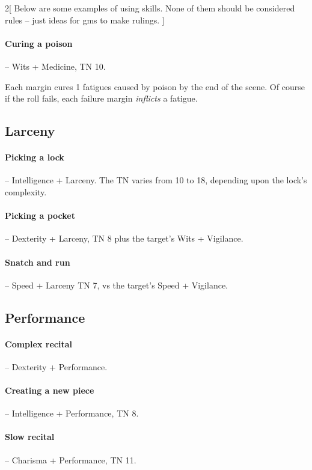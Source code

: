 \begin{multicols}{2}[
  Below are some examples of using skills.
  None of them should be considered rules -- just ideas for \glspl{gm} to make rulings.
]
\paragraph{Curing a poison} -- Wits + Medicine, TN 10.

Each margin cures 1 \glspl{fatigue} caused by poison by the end of the scene.
Of course if the roll fails, each failure margin \emph{inflicts} a \gls{fatigue}.

\subsection{Larceny}

\paragraph{Picking a lock} -- Intelligence + Larceny.
The TN varies from 10 to 18, depending upon the lock's complexity.

\paragraph{Picking a pocket} -- Dexterity + Larceny, TN 8 plus the target's Wits + Vigilance.

\paragraph{Snatch and run} -- Speed + Larceny TN 7, vs the target's Speed + Vigilance.

\subsection{Performance}

\paragraph{Complex recital} -- Dexterity + Performance.

\paragraph{Creating a new piece} -- Intelligence + Performance, TN 8.

\paragraph{Slow recital} -- Charisma + Performance, TN 11.


\end{multicols}
